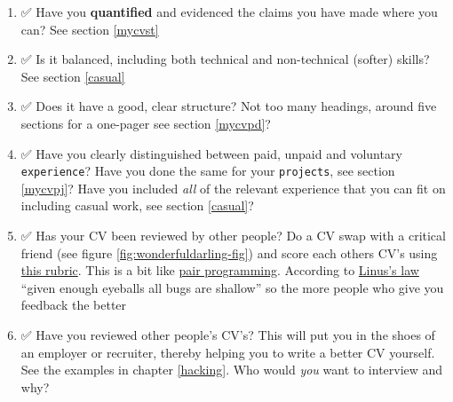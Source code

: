 \documentclass[
]{book}
\begin{document}
\begin{enumerate}
\item
  ✅ Have you \textbf{quantified} and evidenced the claims you have made where you can? See section \ref{mycvst}
\item
  ✅ Is it balanced, including both technical and non-technical (softer) skills? See section \ref{casual}
\item
  ✅ Does it have a good, clear structure? Not too many headings, around five sections for a one-pager see section \ref{mycvpd}?
\item
  ✅ Have you clearly distinguished between paid, unpaid and voluntary \texttt{experience}? Have you done the same for your \texttt{projects}, see section \ref{mycvpj}? Have you included \emph{all} of the relevant experience that you can fit on including casual work, see section \ref{casual}?
\item
  ✅ Has your CV been reviewed by other people? Do a CV swap with a critical friend (see figure \ref{fig:wonderfuldarling-fig}) and score each others CV's using \href{https://www.cdyf.me/CV-rubric.pdf}{this rubric}. This is a bit like \href{https://en.wikipedia.org/wiki/Pair_programming}{pair programming}. According to \href{https://en.wikipedia.org/wiki/Linus\%27s_law}{Linus's law} ``given enough eyeballs all bugs are shallow'' \citep{Raymond1999} so the more people who give you feedback the better
\item
  ✅ Have you reviewed other people's CV's? This will put you in the shoes of an employer or recruiter, thereby helping you to write a better CV yourself. See the examples in chapter \ref{hacking}. Who would \emph{you} want to interview and why?
\end{enumerate}
\end{document}
